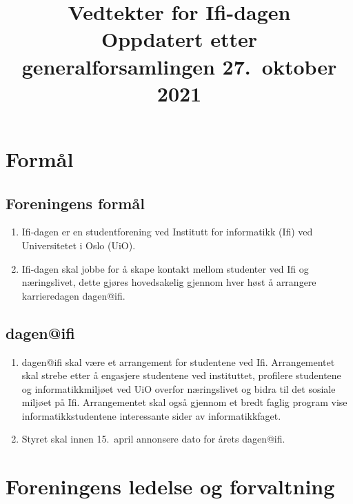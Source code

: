 \documentclass[norsk,a4paper]{article}
\title{\textbf{Vedtekter for Ifi-dagen} \\
{\large Oppdatert etter generalforsamlingen 27.\ oktober 2021}}
\date{}
\begin{document}
\maketitle{}
\thispagestyle{fancy}

\section{Formål}
\subsection{Foreningens formål}
\begin{enumerate}
    \item{Ifi-dagen er en studentforening ved Institutt for informatikk (Ifi) ved Universitetet i Oslo (UiO).}
    \item{Ifi-dagen skal jobbe for å skape kontakt mellom studenter ved Ifi og næringslivet, dette gjøres hovedsakelig gjennom hver høst å arrangere karrieredagen dagen@ifi.}
\end{enumerate}
\subsection{dagen@ifi}
\begin{enumerate}
    \item{dagen@ifi skal være et arrangement for studentene ved Ifi. Arrangementet skal strebe etter å engasjere studentene ved instituttet, profilere studentene og informatikkmiljøet ved UiO overfor næringslivet og bidra til det sosiale miljøet på Ifi. Arrangementet skal også gjennom et bredt faglig program vise informatikkstudentene interessante sider av informatikkfaget.}
    \item{Styret skal innen 15.\ april annonsere dato for årets dagen@ifi.}
\end{enumerate}

\section{Foreningens ledelse og forvaltning}
\end{document}
